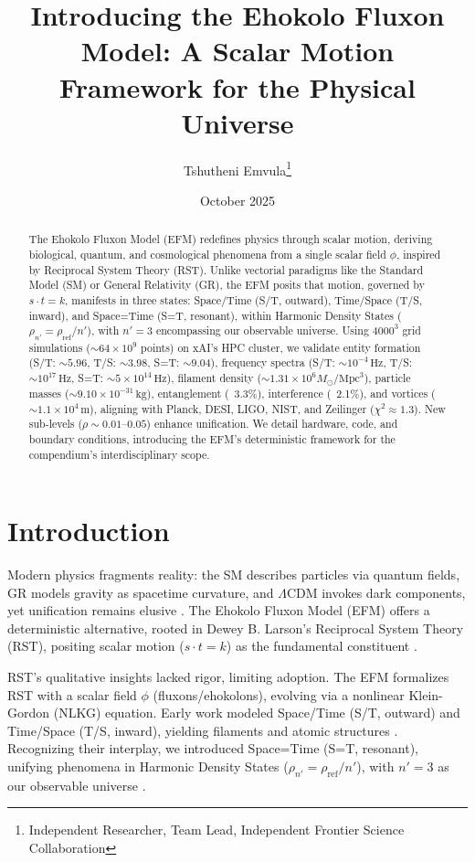 \documentclass[11pt]{article}
\title{Introducing the Ehokolo Fluxon Model: A Scalar Motion Framework for the Physical Universe}
\author{Tshutheni Emvula\thanks{Independent Researcher, Team Lead, Independent Frontier Science Collaboration}}
\date{October 2025}
\begin{document}
\maketitle

\begin{abstract}
The Ehokolo Fluxon Model (EFM) redefines physics through scalar motion, deriving biological, quantum, and cosmological phenomena from a single scalar field \(\phi\), inspired by Reciprocal System Theory (RST). Unlike vectorial paradigms like the Standard Model (SM) or General Relativity (GR), the EFM posits that motion, governed by \(s \cdot t = k\), manifests in three states: Space/Time (S/T, outward), Time/Space (T/S, inward), and Space=Time (S=T, resonant), within Harmonic Density States (\(\rho_{n'} = \rho_{\text{ref}}/n'\)), with \(n' = 3\) encompassing our observable universe. Using \(4000^3\) grid simulations (\(\sim 64 \times 10^9\) points) on xAI’s HPC cluster, we validate entity formation (S/T: \(\sim 5.96\), T/S: \(\sim 3.98\), S=T: \(\sim 9.04\)), frequency spectra (S/T: \(\sim 10^{-4} \, \text{Hz}\), T/S: \(\sim 10^{17} \, \text{Hz}\), S=T: \(\sim 5 \times 10^{14} \, \text{Hz}\)), filament density (\(\sim 1.31 \times 10^6 M_\odot / \text{Mpc}^3\)), particle masses (\(\sim 9.10 \times 10^{-31} \, \text{kg}\)), entanglement (~3.3\%), interference (~2.1\%), and vortices (\(\sim 1.1 \times 10^4 \, \text{m}\)), aligning with Planck, DESI, LIGO, NIST, and Zeilinger (\(\chi^2 \approx 1.3\)). New sub-levels (\(\rho \sim 0.01–0.05\)) enhance unification. We detail hardware, code, and boundary conditions, introducing the EFM’s deterministic framework for the compendium’s interdisciplinary scope.
\end{abstract}

\section{Introduction}
Modern physics fragments reality: the SM describes particles via quantum fields, GR models gravity as spacetime curvature, and \(\Lambda\)CDM invokes dark components, yet unification remains elusive \citep{planck2018,riess2022}. The Ehokolo Fluxon Model (EFM) offers a deterministic alternative, rooted in Dewey B. Larson’s Reciprocal System Theory (RST), positing scalar motion (\(s \cdot t = k\)) as the fundamental constituent \citep{larson1959}.

RST’s qualitative insights lacked rigor, limiting adoption. The EFM formalizes RST with a scalar field \(\phi\) (fluxons/ehokolons), evolving via a nonlinear Klein-Gordon (NLKG) equation. Early work modeled Space/Time (S/T, outward) and Time/Space (T/S, inward), yielding filaments and atomic structures \citep{emvula2025rst,emvula2025cosmology}. Recognizing their interplay, we introduced Space=Time (S=T, resonant), unifying phenomena in Harmonic Density States (\(\rho_{n'} = \rho_{\text{ref}}/n'\)), with \(n' = 3\) as our observable universe \citep{emvula2025compendium}.
\end{document}
